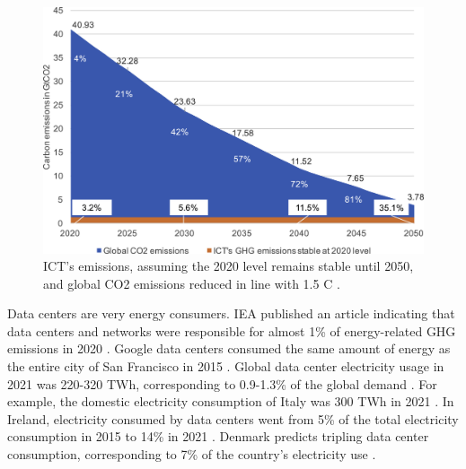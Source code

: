 \begin{figure}[!htb]
    \centering
    \includegraphics[scale=0.8]{Images/Related_works/gr6_lrg.jpg}
    \caption[ICT's emissions, assuming the 2020 level remains stable until 2050, and global CO2 emissions reduced in line with 1.5 \degree C.]{ICT's emissions, assuming the 2020 level remains stable until 2050, and global CO2 emissions reduced in line with 1.5 \degree C \cite{freitag2021climate}.}
    \label{fig:stable_emissions_ICT}
\end{figure}


Data centers are very energy consumers. IEA published an article indicating that data centers and networks were responsible for almost 1\% of energy-related GHG emissions in 2020 \cite{centres2022data}. Google data centers consumed the same amount of energy as the entire city of San Francisco in 2015 \cite{khan2018exploiting}. Global data center electricity usage in 2021 was 220-320 TWh, corresponding to 0.9-1.3\% of the global demand \cite{centres2022data}. For example, the domestic electricity consumption of Italy was 300 TWh in 2021 \cite{ElectricityDomesticConsumption}. In Ireland, electricity consumed by data centers went from 5\% of the total electricity consumption in 2015 to 14\% in 2021 \cite{IrelandDatacenter}. Denmark predicts tripling data center consumption, corresponding to 7\% of the country’s electricity use \cite{DenmarkDatacenter}.

